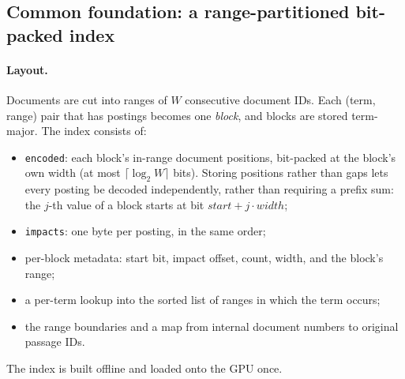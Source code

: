 \documentclass[11pt]{article}
\begin{document}
\subsection{Common foundation: a range-partitioned bit-packed index}
\paragraph{Layout.} Documents are cut into ranges of $W$
consecutive document IDs. Each (term, range) pair that has postings becomes one \emph{block}, and blocks
are stored term-major. The index consists of:
\begin{itemize}
\item \texttt{encoded}: each block's in-range document positions, bit-packed at the block's own width
  (at most $\lceil\log_2 W\rceil$ bits). Storing positions rather than gaps lets every posting be
  decoded independently, rather than requiring a prefix sum: the $j$-th value of a block starts at bit $\mathit{start} + j \cdot
  \mathit{width}$;
\item \texttt{impacts}: one byte per posting, in the same order;
\item per-block metadata: start bit, impact offset, count, width, and the block's range;
\item a per-term lookup into the sorted list of ranges in which the term occurs;
\item the range boundaries and a map from internal document numbers to original passage IDs.
\end{itemize}
The index is built offline and loaded onto the GPU once.
\end{document}
